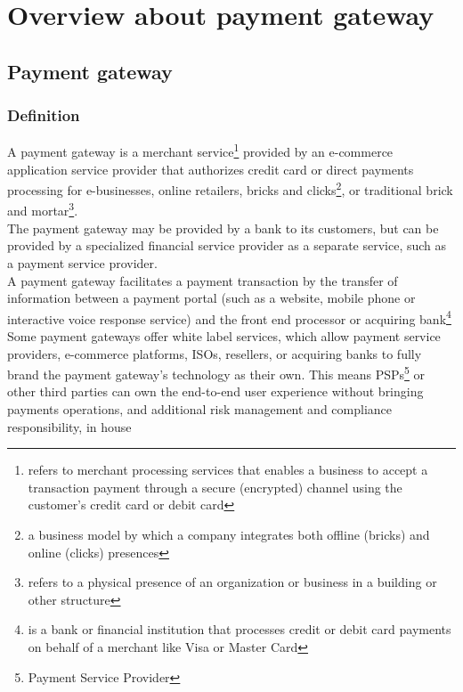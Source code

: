 \documentclass[12pt,a4paper]{article}
\begin{document}
\section{Overview about payment gateway}
\subsection{Payment gateway}
	\subsubsection{Definition}
	A payment gateway is a merchant service\footnote{refers to merchant processing services that enables a business to accept a transaction payment through a secure (encrypted) channel using the customer's credit card or debit card} provided by an e-commerce application service provider that authorizes credit card or direct payments processing for e-businesses, online retailers, bricks and clicks\footnote{a business model by which a company integrates both offline (bricks) and online (clicks) presences}, or traditional brick and mortar\footnote{refers to a physical presence of an organization or business in a building or other structure}. \\
	The payment gateway may be provided by a bank to its customers, but can be provided by a specialized financial service provider as a separate service, such as a payment service provider.\\
	A payment gateway facilitates a payment transaction by the transfer of information between a payment portal (such as a website, mobile phone or interactive voice response service) and the front end processor or acquiring bank\footnote{is a bank or financial institution that processes credit or debit card payments on behalf of a merchant like Visa or Master Card}
	Some payment gateways offer white label services, which allow payment service providers, e-commerce platforms, ISOs, resellers, or acquiring banks to fully brand the payment gateway’s technology as their own. This means PSPs\footnote{Payment Service Provider} or other third parties can own the end-to-end user experience without bringing payments operations,  and additional risk management and compliance responsibility, in house
\end{document}
